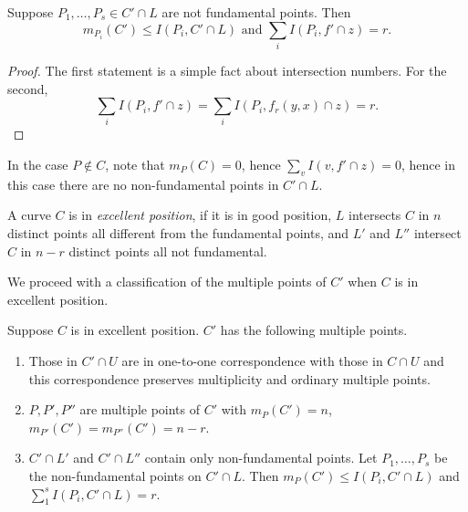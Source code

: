     \begin{lemma}\label{TechnialQuadraticTransformLemma}
        Suppose $P_1,\dots,P_s\in C'\cap L$ are not fundamental points. Then 
        $$m_{P_i}(C')\leq I(P_i,C'\cap L) \text{ and } \sum_{i}I(P_i,f'\cap z)=r.$$
    \end{lemma}
    \begin{proof}
        The first statement is a simple fact about intersection numbers. For the second, 
        $$
            \sum_{i}I(P_i,f'\cap z) = \sum_i I(P_i,f_r(y,x)\cap z) = r.
        $$
    \end{proof}
    \begin{remark}
        In the case $P\notin C$, note that $m_{P}(C)=0$, hence $\sum_v I(v,f'\cap z) = 0$, hence in this case there are no non-fundamental points in $C'\cap L$.  
    \end{remark}
    \begin{definition}
        A curve $C$ is in \emph{excellent position}, if it is in good position, $L$ intersects $C$ in $n$ distinct points all different from the fundamental points, and $L'$ and $L''$ intersect $C$ in $n-r$ distinct points all not fundamental.  
    \end{definition}
    We proceed with a classification of the multiple points of $C'$ when $C$ is in excellent position. 
    \begin{lemma}\label{TheOrdinaryPointsOfACurveInExcellentPosition}
        Suppose $C$ is in excellent position. $C'$ has the following multiple points.
        \begin{enumerate}
            \item Those in $C'\cap U$ are in one-to-one correspondence with those in $C\cap U$ and this correspondence preserves multiplicity and ordinary multiple points. 
            \item $P,P',P''$ are multiple points of $C'$ with $m_P(C')=n$, $m_{P'}(C')=m_{P''}(C')=n-r$.
            \item $C'\cap L'$ and $C'\cap L''$ contain only non-fundamental points. Let $P_1,\dots,P_s$ be the non-fundamental points on $C'\cap L$. Then $m_P(C')\leq I(P_i,C'\cap L)$ and $\sum_1^s I(P_i, C'\cap L)=r$.
        \end{enumerate}
    \end{lemma}
